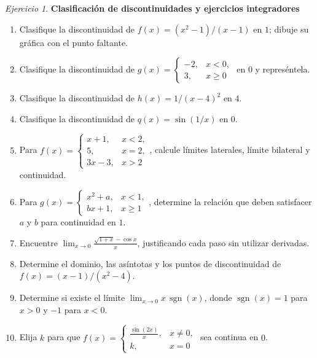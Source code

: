\documentclass[12pt]{article}
\theoremstyle{remark}
\newtheorem{Ejer}{Ejercicio}
\begin{document}
\begin{Ejer}\textbf{Clasificación de discontinuidades y ejercicios integradores}
\begin{enumerate}[resume=banco]
\item Clasifique la discontinuidad de $f(x)=(x^2-1)/(x-1)$ en $1$; dibuje su gráfica con el punto faltante.
\item Clasifique la discontinuidad de $g(x)=\begin{cases}-2,&x<0,\\3,&x\ge0\end{cases}$ en $0$ y represéntela.
\item Clasifique la discontinuidad de $h(x)=1/(x-4)^2$ en $4$.
\item Clasifique la discontinuidad de $q(x)=\sin(1/x)$ en $0$.
\item Para $f(x)=\begin{cases}x+1,&x<2,\\5,&x=2,\\3x-3,&x>2\end{cases}$, calcule límites laterales, límite bilateral y continuidad.
\item Para $g(x)=\begin{cases}x^2+a,&x<1,\\bx+1,&x\ge1\end{cases}$, determine la relación que deben satisfacer $a$ y $b$ para continuidad en $1$.
\item Encuentre $\lim_{x\to0}\frac{\sqrt{1+x}-\cos x}{x}$, justificando cada paso sin utilizar derivadas.
\item Determine el dominio, las asíntotas y los puntos de discontinuidad de $f(x)=(x-1)/(x^2-4)$.
\item Determine si existe el límite $\lim_{x\to0} x\,\operatorname{sgn}(x)$, donde $\operatorname{sgn}(x)=1$ para $x>0$ y $-1$ para $x<0$.
\item Elija $k$ para que $f(x)=\begin{cases}\frac{\sin(2x)}{x},&x\ne0,\\k,&x=0\end{cases}$ sea continua en $0$.
\end{enumerate}
\end{Ejer}
\end{document}
